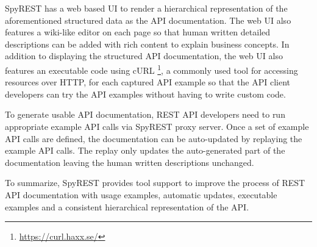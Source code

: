 \documentclass[10pt, conference]{IEEEtran}
\begin{document}
SpyREST has a web based UI to render a hierarchical representation of the aforementioned structured data as the API documentation. The web UI also features a wiki-like editor on each page so that human written detailed descriptions can be added with rich content to explain business concepts. In addition to displaying the structured API documentation, the web UI also features an executable code using cURL \footnote{\url{https://curl.haxx.se/}}, a commonly used tool for accessing resources over HTTP, for each captured API example so that the API client developers can try the API examples without having to write custom code.

To generate usable API documentation, REST API developers need to run appropriate example API calls via SpyREST proxy server. Once a set of example API calls are defined, the documentation can be auto-updated by replaying the example API calls. The replay only updates the auto-generated part of the documentation leaving the human written descriptions unchanged.

To summarize, SpyREST provides tool support to improve the process of REST API documentation with usage examples, automatic updates, executable examples and a consistent hierarchical representation of the API.


%
%

\end{document}
